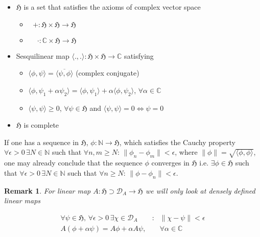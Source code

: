 \documentclass{article}
\newtheorem{remark}{Remark}
\begin{document}
\begin{itemize}
\item $\mathfrak{H}$ is a set that satisfies the axioms of complex vector space

\begin{itemize}
\item $\phantom{\cdot}+:\mathfrak{H}\times\mathfrak{H}\rightarrow\mathfrak{H}$
\item $\phantom{+}\cdot:\mathbb{C}\times\mathfrak{H}\rightarrow\mathfrak{H}$
\end{itemize}

\item Sesquilinear map $\langle.,.\rangle:\mathfrak{H}\times\mathfrak{H}\rightarrow\mathbb{C}$ satisfying

\begin{itemize}
\item $\langle\phi,\psi\rangle = \overline{\langle\psi,\phi\rangle}$ (complex conjugate)
\item $\langle\phi,\psi_1 + \alpha\psi_2\rangle = \langle\phi,\psi_1\rangle + \alpha\langle\phi,\psi_2\rangle$, $\forall \alpha \in \mathbb{C}$
\item $\langle\psi,\psi\rangle \geq 0$, $\forall \psi \in \mathfrak{H}$ and $\langle\psi,\psi\rangle = 0 \Leftrightarrow \psi = 0$
\end{itemize}

\item $\mathfrak{H}$ is complete
\end{itemize}

If one has a sequence in $\mathfrak{H}$, $\phi:\mathbb{N}\rightarrow\mathfrak{H}$, which satisfies the Cauchy property $\forall\epsilon > 0\,\exists N \in \mathbb{N}$ such that $\forall n,m \geq N$: $\|\phi_n - \phi_m\| < \epsilon$, where $\|\phi\| = \sqrt{\langle\phi,\phi\rangle}$, one may already conclude that the sequence $\phi$ converges in $\mathfrak{H}$ i.e. $\exists\phi\in\mathfrak{H}$ such that $\forall\epsilon > 0\,\exists N \in \mathbb{N}$ such that $\forall n \geq N$: $\|\phi - \phi_n\| < \epsilon$.

\begin{remark}
For linear map $A:\mathfrak{H} \supset \mathcal{D}_A \rightarrow \mathfrak{H}$ we will only look at densely defined linear maps

\begin{align*}
\forall\psi\in\mathfrak{H}, \,\forall\epsilon > 0 \,\exists \chi\in\mathcal{D}_A &: & \|\chi - \psi\| < \epsilon \\
A(\phi + \alpha\psi) = A\phi + \alpha A\psi, & & \forall \alpha \in \mathbb{C}
\end{align*}

\end{remark}
\end{document}
